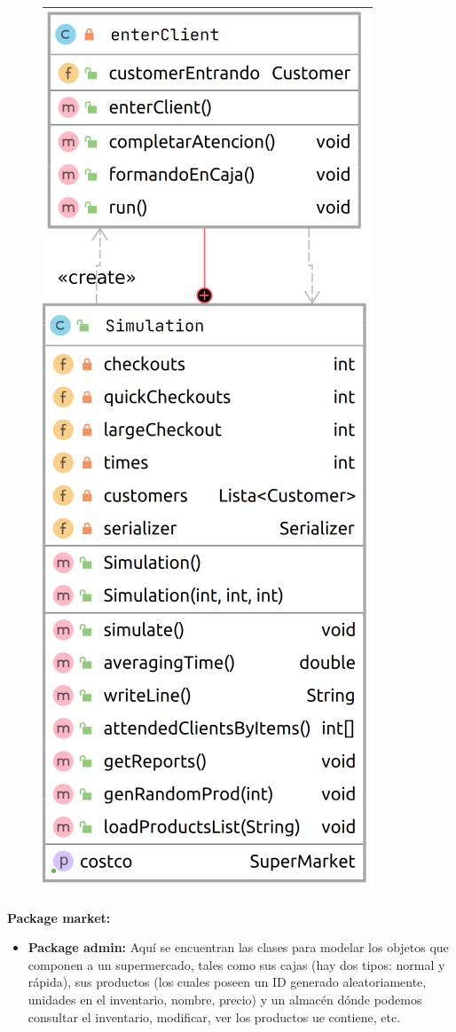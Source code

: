 \documentclass[letterpaper,11pt]{article}
\begin{document}
\begin{figure}[htb]
	\centering
	\includegraphics[scale=.33]{sim_diagram.png}
\end{figure}
\textbf{Package market: }
\begin{itemize}
	\item \textbf{Package admin: } Aquí se encuentran las clases para modelar los objetos que componen a un supermercado, tales como sus cajas (hay dos tipos: normal y rápida), sus productos (los cuales poseen un ID generado aleatoriamente, unidades en el inventario, nombre, precio) y un almacén dónde podemos consultar el inventario, modificar, ver los productos ue contiene, etc. 
\end{itemize}
\end{document}
